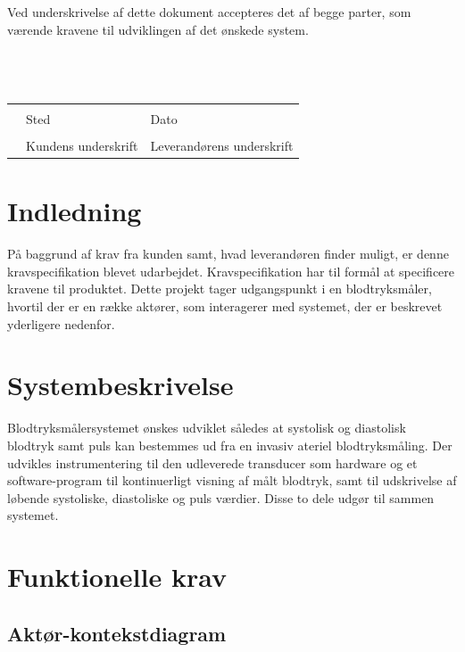 Ved underskrivelse af dette dokument accepteres det af begge parter, som værende kravene til udviklingen af det ønskede system.
\\
\\
\\
\\
\noindent \begin{tabular}{lll} 
	& 	\makebox[2.5in]{\hrulefill} 	& 	\makebox[2.5in]{\hrulefill}\\
	&	Sted						&	Dato\\[7ex]
	& 	\makebox[2.5in]{\hrulefill} 	& 	\makebox[2.5in]{\hrulefill}\\
	& 	Kundens underskrift 		& 	Leverandørens underskrift\\[7ex]

\end{tabular}

\newpage
\section{Indledning}
På baggrund af krav fra kunden samt, hvad leverandøren finder muligt, er denne kravspecifikation blevet udarbejdet. Kravspecifikation har til formål at specificere kravene til produktet. Dette projekt tager udgangspunkt i en blodtryksmåler, hvortil der er en række aktører, som interagerer med systemet, der er beskrevet yderligere nedenfor.

\section{Systembeskrivelse}
Blodtryksmålersystemet ønskes udviklet således at systolisk og diastolisk blodtryk samt puls kan bestemmes ud fra en invasiv ateriel blodtryksmåling. Der udvikles instrumentering til den udleverede transducer som hardware og et software-program til kontinuerligt visning af målt blodtryk, samt til udskrivelse af løbende systoliske, diastoliske og puls værdier. Disse to dele udgør til sammen systemet. 

\section{Funktionelle krav}
 

\subsection{Aktør-kontekstdiagram}


